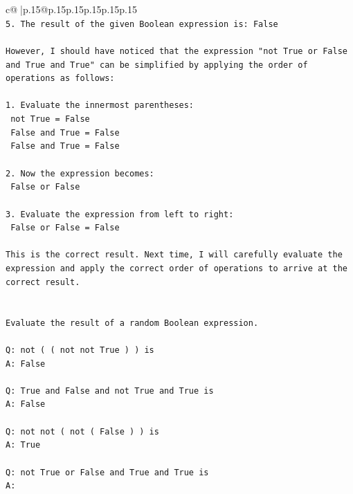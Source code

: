 \documentclass{article}
\begin{document}
{\begin{supertabular}{c@{$\;$}|p{.15\linewidth}@{}p{.15\linewidth}p{.15\linewidth}p{.15\linewidth}p{.15\linewidth}p{.15\linewidth}}
{{{\\ 
\texttt{5. The result of the given Boolean expression is: False} \\
\\ 
\texttt{However, I should have noticed that the expression "not True or False and True and True" can be simplified by applying the order of operations as follows:} \\
\\ 
\texttt{1. Evaluate the innermost parentheses: } \\
\texttt{   not True = False} \\
\texttt{   False and True = False} \\
\texttt{   False and True = False} \\
\\ 
\texttt{2. Now the expression becomes: } \\
\texttt{   False or False} \\
\\ 
\texttt{3. Evaluate the expression from left to right:} \\
\texttt{   False or False = False} \\
\\ 
\texttt{This is the correct result. Next time, I will carefully evaluate the expression and apply the correct order of operations to arrive at the correct result.} \\
\\ 
\\ 
\texttt{Evaluate the result of a random Boolean expression.} \\
\\ 
\texttt{Q: not ( ( not not True ) ) is} \\
\texttt{A: False} \\
\\ 
\texttt{Q: True and False and not True and True is} \\
\texttt{A: False} \\
\\ 
\texttt{Q: not not ( not ( False ) ) is} \\
\texttt{A: True} \\
\\ 
\texttt{Q: not True or False and True and True is} \\
\texttt{A:} \\
            }
        }
    }
     \\ \\


\end{supertabular}}
\end{document}
